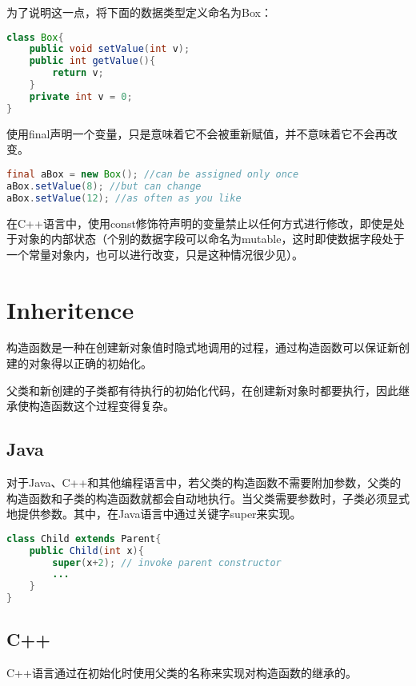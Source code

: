 为了说明这一点，将下面的数据类型定义命名为Box：

\begin{lstlisting}[language=Java]
class Box{
	public void setValue(int v);
	public int getValue(){
		return v;
	}
	private int v = 0;
}
\end{lstlisting}

使用final声明一个变量，只是意味着它不会被重新赋值，并不意味着它不会再改变。



\begin{lstlisting}[language=Java]
final aBox = new Box(); //can be assigned only once
aBox.setValue(8); //but can change
aBox.setValue(12); //as often as you like
\end{lstlisting}

在C++语言中，使用const修饰符声明的变量禁止以任何方式进行修改，即使是处于对象的内部状态（个别的数据字段可以命名为mutable，这时即使数据字段处于一个常量对象内，也可以进行改变，只是这种情况很少见）。


\section{Inheritence}


构造函数是一种在创建新对象值时隐式地调用的过程，通过构造函数可以保证新创建的对象得以正确的初始化。

父类和新创建的子类都有待执行的初始化代码，在创建新对象时都要执行，因此继承使构造函数这个过程变得复杂。


\subsection{Java}


对于Java、C++和其他编程语言中，若父类的构造函数不需要附加参数，父类的构造函数和子类的构造函数就都会自动地执行。当父类需要参数时，子类必须显式地提供参数。其中，在Java语言中通过关键字super来实现。




\begin{lstlisting}[language=Java]
class Child extends Parent{
	public Child(int x){
		super(x+2); // invoke parent constructor
		...
	}
}
\end{lstlisting}


\subsection{C++}

C++语言通过在初始化时使用父类的名称来实现对构造函数的继承的。



